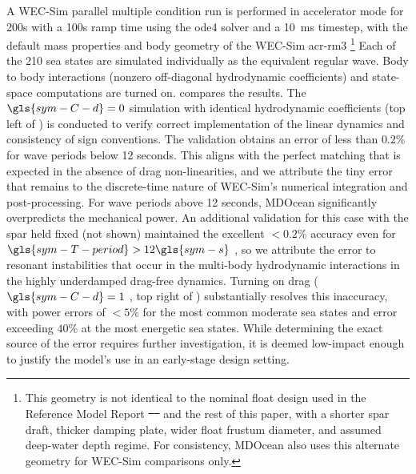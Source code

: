 \documentclass[a4paper,fleqn,colorlinks,unicode,lineno]{cas-dc} %
\makeatletter
\providecommand{\DIFaddtex}[1]{{\protect\color{blue}\uwave{#1}}} %
\providecommand{\DIFdeltex}[1]{{\protect\color{red}\sout{#1}}} %
\providecommand{\DIFaddbegin}{} %
\providecommand{\DIFaddend}{} %
\providecommand{\DIFdelbegin}{} %
\providecommand{\DIFdelend}{} %
\providecommand{\DIFadd}[1]{\texorpdfstring{\DIFaddtex{#1}}{#1}} %
\providecommand{\DIFdel}[1]{\texorpdfstring{\DIFdeltex{#1}}{}} %
\providecommand{\DIFscaledelfig}{0.5}
\newlength{\DIFdelgraphicswidth} %
\newlength{\DIFdelgraphicsheight} %
\providecommand{\DIFaddincludegraphics}[2][]{{\color{blue}\fbox{\DIFOincludegraphics[#1]{#2}}}} %
\providecommand{\DIFdelincludegraphics}[2][]{%
\sbox{\DIFdelgraphicsbox}{\DIFOincludegraphics[#1]{#2}}%
\settoboxwidth{\DIFdelgraphicswidth}{\DIFdelgraphicsbox} %
\settoboxtotalheight{\DIFdelgraphicsheight}{\DIFdelgraphicsbox} %
\scalebox{\DIFscaledelfig}{%
\parbox[b]{\DIFdelgraphicswidth}{\usebox{\DIFdelgraphicsbox}\\[-\baselineskip] \rule{\DIFdelgraphicswidth}{0em}}\llap{\resizebox{\DIFdelgraphicswidth}{\DIFdelgraphicsheight}{%
\setlength{\unitlength}{\DIFdelgraphicswidth}%
\begin{picture}(1,1)%
\thicklines\linethickness{2pt} %
{\color[rgb]{1,0,0}\put(0,0){\framebox(1,1){}}}%
{\color[rgb]{1,0,0}\put(0,0){\line( 1,1){1}}}%
{\color[rgb]{1,0,0}\put(0,1){\line(1,-1){1}}}%
\end{picture}%
}\hspace*{3pt}}} %
} %
\DeclareRobustCommand{\DIFaddbegin}{\DIFOaddbegin \let\includegraphics\DIFaddincludegraphics} %
\DeclareRobustCommand{\DIFaddend}{\DIFOaddend \let\includegraphics\DIFOincludegraphics} %
\DeclareRobustCommand{\DIFdelbegin}{\DIFOdelbegin \let\includegraphics\DIFdelincludegraphics} %
\DeclareRobustCommand{\DIFdelend}{\DIFOaddend \let\includegraphics\DIFOincludegraphics} %
\let\sout@orig\sout %
\renewcommand{\sout}[1]{\ifmmode\text{\sout@orig{\ensuremath{#1}}}\else\sout@orig{#1}\fi} %
\makeatother
\begin{document}
A WEC-Sim parallel multiple condition run is performed in accelerator mode for 200s with a 100s ramp time using the ode4 solver and a 10~ms timestep, with the default mass properties and body geometry of the WEC-Sim \gls{acr-rm3} \DIFadd{tutorial.} \footnote{This geometry is not identical to the nominal float design used in the Reference Model Report \DIFdelbegin \DIFdel{\mbox{%
\cite{RM3} }\hskip0pt%
}\DIFdelend \DIFaddbegin \DIFadd{\mbox{%
\citep{RM3} }\hskip0pt%
}\DIFaddend and the rest of this paper, with a shorter spar draft, thicker damping plate, wider float frustum diameter, and assumed deep-water depth regime.
For consistency, MDOcean also uses this alternate geometry for WEC-Sim comparisons only.}
Each of the 210 sea states are simulated individually as the equivalent regular wave.
Body to body interactions (nonzero off-diagonal hydrodynamic coefficients) and state-space computations are turned on.
 compares the results.
The $\gls{sym-C-d}=0$  simulation with identical hydrodynamic coefficients (top left of ) is conducted to verify correct implementation of the linear dynamics and consistency of sign conventions.
The validation obtains an error of less than $0.2\%$ for wave periods below 12 seconds.
This aligns with the perfect matching that is expected in the absence of drag non-linearities, and we attribute the tiny error that remains to the discrete-time nature of WEC-Sim's numerical integration and post-processing.
For wave periods above 12 seconds, MDOcean significantly overpredicts the mechanical power.
An additional validation for this case with the spar held fixed (not shown) maintained the excellent $<0.2\%$ accuracy even for $\gls{sym-T-period}>12 \gls{sym-s}$ , so we attribute the error to resonant instabilities that occur in the multi-body hydrodynamic interactions in the highly underdamped drag-free dynamics.
Turning on drag ($\gls{sym-C-d}=1$ , top right of ) substantially resolves this inaccuracy, with power errors of $<5\%$ for the most common moderate sea states and error exceeding $40\%$ at the most energetic sea states.
While determining the exact source of the error requires further investigation, it is deemed low-impact enough to justify the model's use in an early-stage design setting.
\end{document}
